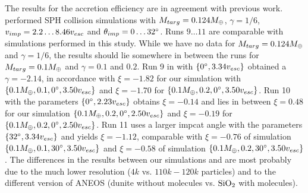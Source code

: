 The results for the accretion efficiency are in agreement with previous work. \cite{Benz:1988p3336} performed SPH collision simulations with $M_{targ} = 0.124 M_{\oplus}$, $\gamma = 1/6$, $v_{imp} = 2.2 \dots 8.46 v_{esc}$ and $\theta_{imp} = 0 \dots 32 ^\circ$. Runs $9 \dots 11$ are comparable with simulations performed in this study. While we have no data for $M_{targ} = 0.124 M_{\oplus}$ and $\gamma = 1/6$, the results should lie somewhere in between the runs for $M_{targ} = 0.1 M_{\oplus}$ and $\gamma = 0.1$ and $0.2$. Run 9 in  \cite{Benz:1988p3336} with $\{0 ^\circ, 3.34 v_{esc} \}$ obtained a $\gamma = -2.14$, in accordance with $\xi = -1.82$ for our simulation with $\{0.1 M_{\oplus}, 0.1, 0 ^\circ, 3.50 v_{esc} \}$ and $\xi = -1.70$ for $\{0.1 M_{\oplus}, 0.2, 0 ^\circ, 3.50 v_{esc} \}$. Run 10 with the parameters $\{ 0 ^\circ, 2.23 v_{esc} \}$ obtains $\xi = -0.14$ and lies in between $\xi = 0.48$ for our simulation $\{0.1 M_{\oplus}, 0.2, 0 ^\circ, 2.50 v_{esc} \}$ and $\xi = -0.19$ for $\{0.1 M_{\oplus}, 0.2, 0 ^\circ, 2.50 v_{esc} \}$. Run 11 uses a larger impcat angle with the parameters $\{ 32 ^\circ, 3.34 v_{esc} \}$ and yields $\xi = -1.12$, comparable with $\xi = -0.76$ of simulation $\{0.1 M_{\oplus}, 0.1, 30 ^\circ, 3.50 v_{esc} \}$ and $\xi = -0.58$ of simulation $\{0.1 M_{\oplus}, 0.2, 30 ^\circ, 3.50 v_{esc} \}$. The differences in the results between our simulations and  \cite{Benz:1988p3336}  are most probably due to the much lower resolution ($4k$ vs. $110k - 120k$ particles) and to the different version of ANEOS (dunite without molecules vs. $\mathrm{SiO}_2$ with molecules).

